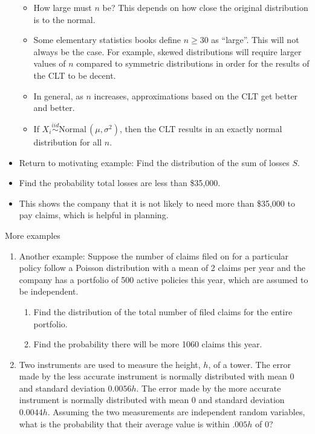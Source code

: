 \documentclass{article}
\newcommand{\followsp}[2]{\overset{#1}\sim \text{#2}\,}		%
\begin{document}
\begin{itemize}
\begin{itemize}
        \item How large must $n$ be? This depends on how close the original distribution is to the normal.
        \item[] Some elementary statistics books define $n \ge 30$ as ``large''. This will not always be the case. For example, skewed distributions will require larger values of $n$ compared to symmetric distributions in order for the results of the CLT to be decent.
        \item In general, as $n$ increases, approximations based on the CLT get better and better. 
        \item If $X_i \followsp{iid}{Normal}(\mu, \sigma^2)$, then the CLT results in an exactly normal distribution for all $n$.
    \end{itemize}\bigskip
    \item Return to motivating example: Find the distribution of the sum of losses $S$.\vspace{30pt}
    \item[] Find the probability total losses are less than \$35,000.\vspace{70pt}
    \item[] This shows the company that it is not likely to need more than \$35,000 to pay claims, which is helpful in planning.
\end{itemize}\bigskip

More examples\bigskip
\begin{enumerate}
    \item Another example: Suppose the number of claims filed on for a particular policy follow a Poisson distribution with a mean of 2 claims per year and the company has a portfolio of 500 active policies this year, which are assumed to be independent.
    \begin{enumerate}
        \item Find the distribution of the total number of filed claims for the entire portfolio.\vspace{80pt}
        \item Find the probability there will be more 1060 claims this year.\vspace{80pt}
    \end{enumerate}
    \item Two instruments are used to measure the height, $h$, of a tower. The error made by the less accurate instrument is normally distributed with mean 0 and standard deviation $0.0056h$. The error made by the more accurate instrument is normally distributed with mean 0 and standard deviation $0.0044h$. Assuming the two measurements are independent random variables, what is the probability that their average value is within $.005h$ of 0?\vspace{200pt}
\end{enumerate}\bigskip
\end{document}
